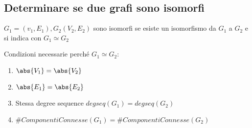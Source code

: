 {{\subsection{Determinare se due grafi sono isomorfi}

{$G_1=(v_1,E_1),G_2(V_2,E_2)$ sono isomorfi se esiste un isomorfismo da $G_1$ a $G_2$ e si indica con $G_1\simeq G_2$}

{Condizioni necessarie perché $G_1\simeq G_2$:}

\begin{enumerate}
\tightlist
\item
  $\abs{V_1}=\abs{V_2}$
\item
  $\abs{E_1}=\abs{E_2}$
\item
  {Stessa degree sequence $degseq(G_1) = degseq(G_2)$}
\item
  $\#ComponentiConnesse(G_1) = 	\#ComponentiConnesse(G_2)$
\end{enumerate}


}}
